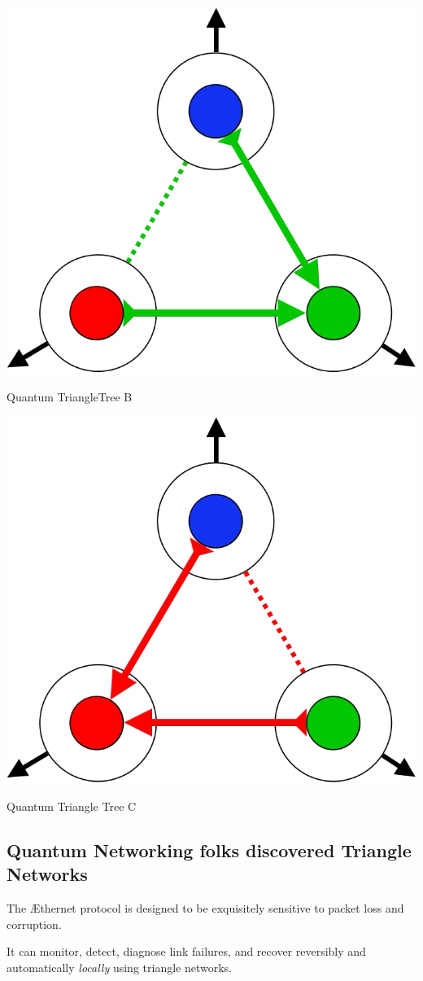 \documentclass[../HFT-main.tex]{subfiles}
\begin{document}
\begin{marginfigure}
  \includegraphics[width=0.5\linewidth]{../Figures/Quantum-Triangle-B.png}
  \caption{Quantum TriangleTree  B}
    \vspace{10pt}
\end{marginfigure}

\begin{marginfigure}
  \includegraphics[width=0.5\linewidth]{../Figures/Quantum-Triangle-C.png}
  \caption{Quantum Triangle Tree C}
    \vspace{10pt}
\end{marginfigure}

\subsection{Quantum Networking folks discovered \textbf{Triangle Networks}}

The Æthernet protocol is designed to be exquisitely sensitive to packet loss and corruption.

It can monitor, detect, diagnose link failures, and recover reversibly and automatically \emph{locally} using triangle networks.

%
\end{document}
